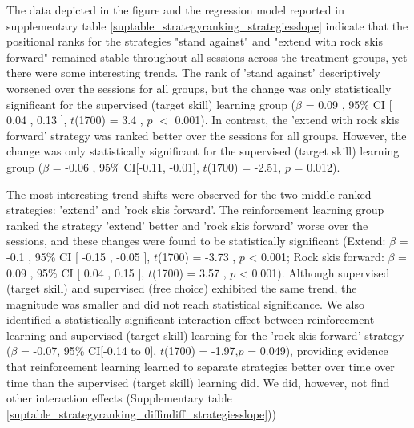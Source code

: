 \documentclass[pdflatex,sn-mathphys-num]{sn-jnl}%
\theoremstyle{thmstyleone}%
\theoremstyle{thmstyletwo}%
\theoremstyle{thmstylethree}%
\begin{document}
The data depicted in the figure and the regression model reported in supplementary table \ref{suptable_strategyranking_strategiesslope} indicate that the positional ranks for the strategies "stand against" and "extend with rock skis forward" remained stable throughout all sessions across the treatment groups, yet there were some interesting trends. The rank of 'stand against' descriptively worsened over the sessions for all groups, but the change was only statistically significant for the supervised (target skill) learning group  ($\beta$ = 0.09 , 95\% CI [ 0.04 ,  0.13 ], $t$(1700) = 3.4 , $p$  $<$  0.001). In contrast, the 'extend with rock skis forward' strategy was ranked better over the sessions for all groups. However, the change was only statistically significant for the supervised (target skill) learning group ($\beta$ = -0.06 , 95\% CI[-0.11, -0.01], $t$(1700) = -2.51, $p$ = 0.012). 

The most interesting trend shifts were observed for the two middle-ranked strategies: 'extend' and 'rock skis forward'. The reinforcement learning group ranked the strategy 'extend' better and 'rock skis forward' worse over the sessions, and these changes were found to be statistically significant (Extend: $\beta$ = -0.1 , 95\% CI [ -0.15 ,  -0.05 ], $t$(1700) = -3.73 , $p$  <  0.001; Rock skis forward:  $\beta$ = 0.09 , 95\% CI [ 0.04 ,  0.15 ], $t$(1700) = 3.57 , $p$  <  0.001). Although supervised (target skill) and supervised (free choice) exhibited the same trend, the magnitude was smaller and did not reach statistical significance. We also identified a statistically significant interaction effect between reinforcement learning and supervised (target skill) learning for the 'rock skis forward' strategy ($\beta$ = -0.07, 95\% CI[-0.14 to 0], $t$(1700) = -1.97,$p$ = 0.049), providing evidence that reinforcement learning learned to separate strategies better over time over time than the supervised (target skill) learning did. We did, however, not find other interaction effects (Supplementary table \ref{suptable_strategyranking_diffindiff_strategiesslope})) 
\end{document}
